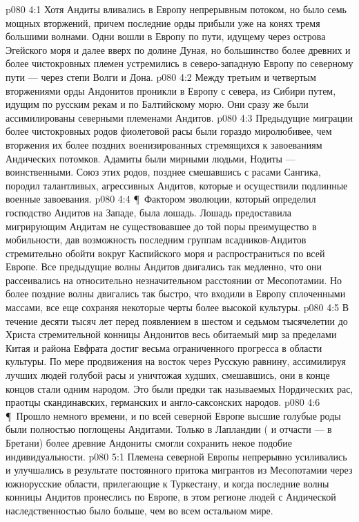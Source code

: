 \vs p080 4:1 Хотя Андиты вливались в Европу непрерывным потоком, но было семь мощных вторжений, причем последние орды прибыли уже на конях тремя большими волнами. Одни вошли в Европу по пути, идущему через острова Эгейского моря и далее вверх по долине Дуная, но большинство более древних и более чистокровных племен устремились в северо\hyp{}западную Европу по северному пути --- через степи Волги и Дона.
\vs p080 4:2 Между третьим и четвертым вторжениями орды Андонитов проникли в Европу с севера, из Сибири путем, идущим по русским рекам и по Балтийскому морю. Они сразу же были ассимилированы северными племенами Андитов.
\vs p080 4:3 Предыдущие миграции более чистокровных родов фиолетовой расы были гораздо миролюбивее, чем вторжения их более поздних военизированных стремящихся к завоеваниям Андических потомков. Адамиты были мирными людьми, Нодиты --- воинственными. Союз этих родов, позднее смешавшись с расами Сангика, породил талантливых, агрессивных Андитов, которые и осуществили подлинные военные завоевания.
\vs p080 4:4 \P\ Фактором эволюции, который определил господство Андитов на Западе, была лошадь. Лошадь предоставила мигрирующим Андитам не существовавшее до той поры преимущество в мобильности, дав возможность последним группам всадников\hyp{}Андитов стремительно обойти вокруг Каспийского моря и распространиться по всей Европе. Все предыдущие волны Андитов двигались так медленно, что они рассеивались на относительно незначительном расстоянии от Месопотамии. Но более поздние волны двигались так быстро, что входили в Европу сплоченными массами, все еще сохраняя некоторые черты более высокой культуры.
\vs p080 4:5 В течение десяти тысяч лет перед появлением в шестом и седьмом тысячелетии до Христа стремительной конницы Андонитов весь обитаемый мир за пределами Китая и района Евфрата достиг весьма ограниченного прогресса в области культуры. По мере продвижения на восток через Русскую равнину, ассимилируя лучших людей голубой расы и уничтожая худших, смешавшись, они в конце концов стали одним народом. Это были предки так называемых Нордических рас, праотцы скандинавских, германских и англо\hyp{}саксонских народов.
\vs p080 4:6 \P\ Прошло немного времени, и по всей северной Европе высшие голубые роды были полностью поглощены Андитами. Только в Лапландии ( и отчасти --- в Бретани) более древние Андониты смогли сохранить некое подобие индивидуальности.
\vs p080 5:1 Племена северной Европы непрерывно усиливались и улучшались в результате постоянного притока мигрантов из Месопотамии через южнорусские области, прилегающие к Туркестану, и когда последние волны конницы Андитов пронеслись по Европе, в этом регионе людей с Андической наследственностью было больше, чем во всем остальном мире.

